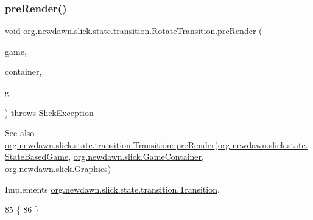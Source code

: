 \subsubsection{\texorpdfstring{pre\+Render()}{preRender()}}
{\footnotesize\ttfamily void org.\+newdawn.\+slick.\+state.\+transition.\+Rotate\+Transition.\+pre\+Render (\begin{DoxyParamCaption}\item[{\mbox{\hyperlink{classorg_1_1newdawn_1_1slick_1_1state_1_1_state_based_game}{State\+Based\+Game}}}]{game,  }\item[{\mbox{\hyperlink{classorg_1_1newdawn_1_1slick_1_1_game_container}{Game\+Container}}}]{container,  }\item[{\mbox{\hyperlink{classorg_1_1newdawn_1_1slick_1_1_graphics}{Graphics}}}]{g }\end{DoxyParamCaption}) throws \mbox{\hyperlink{classorg_1_1newdawn_1_1slick_1_1_slick_exception}{Slick\+Exception}}\hspace{0.3cm}{\ttfamily [inline]}}

\begin{DoxySeeAlso}{See also}
\mbox{\hyperlink{interfaceorg_1_1newdawn_1_1slick_1_1state_1_1transition_1_1_transition_ab8b0668c059830d938575d1a0b08bd93}{org.\+newdawn.\+slick.\+state.\+transition.\+Transition\+::pre\+Render}}(\mbox{\hyperlink{classorg_1_1newdawn_1_1slick_1_1state_1_1_state_based_game}{org.\+newdawn.\+slick.\+state.\+State\+Based\+Game}}, \mbox{\hyperlink{classorg_1_1newdawn_1_1slick_1_1_game_container}{org.\+newdawn.\+slick.\+Game\+Container}}, \mbox{\hyperlink{classorg_1_1newdawn_1_1slick_1_1_graphics}{org.\+newdawn.\+slick.\+Graphics}}) 
\end{DoxySeeAlso}


Implements \mbox{\hyperlink{interfaceorg_1_1newdawn_1_1slick_1_1state_1_1transition_1_1_transition_ab8b0668c059830d938575d1a0b08bd93}{org.\+newdawn.\+slick.\+state.\+transition.\+Transition}}.


\begin{DoxyCode}
85                                               \{
86     \}
\end{DoxyCode}
\mbox{\label{classorg_1_1newdawn_1_1slick_1_1state_1_1transition_1_1_rotate_transition_a9e3f2c191f7f04925f8319b1e85a29f8}} 

